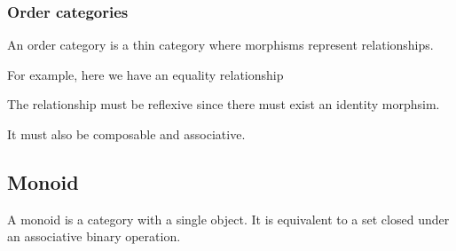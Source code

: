 \documentclass{article}
\begin{document}
\subsubsection{Order categories}

An order category is a thin category where morphisms represent relationships.

For example, here we have an equality relationship

\begin{center}
\end{center}

The relationship must be reflexive since there must exist an identity morphsim.

\begin{center}
\end{center}

It must also be composable and associative.

\subsection{Monoid}

A monoid is a category with a single object.
It is equivalent to a set closed under an associative binary operation. 
\end{document}
